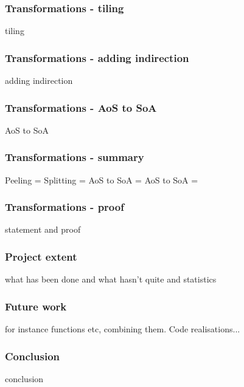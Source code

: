 \begin{frame}[fragile]
\frametitle{Transformations - tiling}

tiling

\end{frame}


\begin{frame}[fragile]
\frametitle{Transformations - adding indirection}

adding indirection

\end{frame}


\begin{frame}[fragile]
\frametitle{Transformations - AoS to SoA}

AoS to SoA

\end{frame}


\begin{frame}[fragile]
\frametitle{Transformations - summary}

Peeling = 
Splitting =
AoS to SoA =
AoS to SoA =

\end{frame}


\begin{frame}[fragile]
\frametitle{Transformations - proof}

statement and proof

\end{frame}


\begin{frame}[fragile]
\frametitle{Project extent}

what has been done and what hasn't quite and statistics

\end{frame}


\begin{frame}[fragile]
\frametitle{Future work}

for instance functions etc, combining them. Code realisations...

\end{frame}


\begin{frame}[fragile]
\frametitle{Conclusion}

conclusion

\end{frame}




